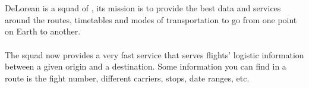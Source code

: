 
\section{\squad}

DeLorean\cite{delorean_squad_home} is a squad of \tribe, its mission is to provide the best data and services around the routes, timetables and modes of transportation to go from one point on Earth to another.
\\\\
The squad now provides a very fast service that serves flights' logistic information between a given origin and a destination. Some information you can find in a route is the fight number, different carriers, stops, date ranges, etc.